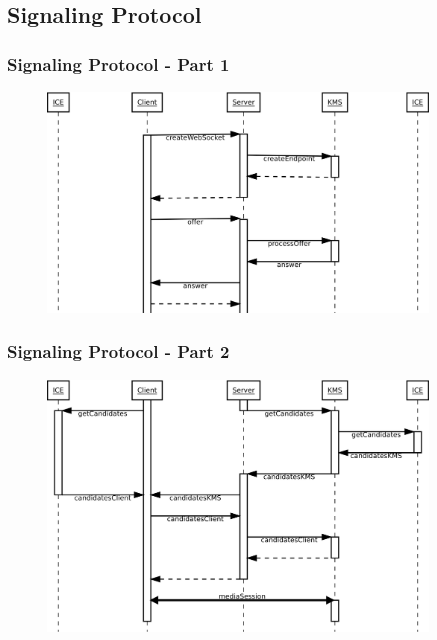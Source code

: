 \documentclass[compress]{beamer}
\begin{document}
\subsection{Signaling Protocol}
\begin{frame}[c]
		\frametitle{Signaling Protocol - Part 1}
		\begin{figure}[H]
			\includegraphics[width=0.9\textwidth]{figures/signaling1.png}
		\end{figure}
\end{frame}
\begin{frame}[c]
		\frametitle{Signaling Protocol - Part 2}
		\begin{figure}[H]
			\includegraphics[width=0.9\textwidth]{figures/signaling2.png}
		\end{figure}
\end{frame}
\end{document}
